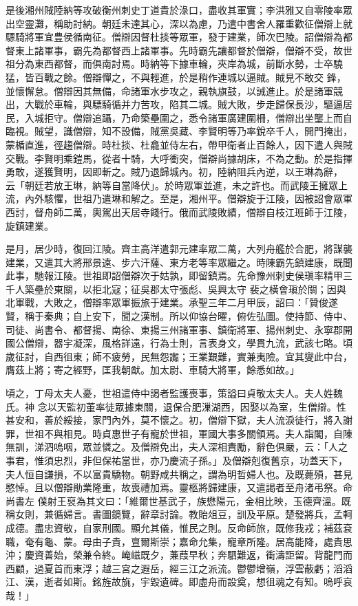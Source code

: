 \begin{pinyinscope}
 是後湘州賊陸納等攻破衡州刺史丁道貴於淥口，盡收其軍實；李洪雅又自零陵率眾出空靈灘，稱助討納。朝廷未達其心，深以為慮，乃遣中書舍人羅重歡征僧辯上就驃騎將軍宜豊侯循南征。僧辯因督杜掞等眾軍，發于建業，師次巴陵。詔僧辯為都督東上諸軍事，霸先為都督西上諸軍事。先時霸先讓都督於僧辯，僧辯不受，故世祖分為東西都督，而俱南討焉。時納等下據車輪，夾岸為城，前斷水勢，士卒驍猛，皆百戰之餘。僧辯憚之，不與輕進，於是稍作連城以逼賊。賊見不敢交
 鋒，並懷懈怠。僧辯因其無備，命諸軍水步攻之，親執旗鼓，以誡進止。於是諸軍競出，大戰於車輪，與驃騎循并力苦攻，陷其二城。賊大敗，步走歸保長沙，驅逼居民，入城拒守。僧辯追躡，乃命築壘圍之，悉令諸軍廣建圍柵，僧辯出坐壟上而自臨視。賊望，識僧辯，知不設備，賊黨吳藏、李賢明等乃率銳卒千人，開門掩出，蒙楯直進，徑趨僧辯。時杜掞、杜龕並侍左右，帶甲衛者止百餘人，因下遣人與賊交戰。李賢明乘鎧馬，從者十騎，大呼衝突，僧辯尚據胡床，不為之動。於是指揮勇敢，遂獲賢明，因即斬之。賊乃退歸城內。初，陸納阻兵內逆，以王琳為辭，
 云「朝廷若放王琳，納等自當降伏」。於時眾軍並進，未之許也。而武陵王擁眾上流，內外駭懼，世祖乃遣琳和解之。至是，湘州平。僧辯旋于江陵，因被詔會眾軍西討，督舟師二萬，輿駕出天居寺餞行。俄而武陵敗績，僧辯自枝江班師于江陵，旋鎮建業。



 是月，居少時，復回江陵。齊主高洋遣郭元建率眾二萬，大列舟艦於合肥，將謀襲建業，又遣其大將邢景遠、步六汗薩、東方老等率眾繼之。時陳霸先鎮建康，既聞此事，馳報江陵。世祖即詔僧辯次于姑孰，即留鎮焉。先命豫州刺史侯瑱率精甲三千人築壘於東關，以拒北寇；征吳郡太守張彪、吳興太守
 裴之橫會瑱於關；因與北軍戰，大敗之，僧辯率眾軍振旅于建業。承聖三年二月甲辰，詔曰：「贊俊遂賢，稱于秦典；自上安下，聞之漢制。所以仰協台曜，俯佐弘圖。使持節、侍中、司徒、尚書令、都督揚、南徐、東揚三州諸軍事、鎮衛將軍、揚州刺史、永寧郡開國公僧辯，器宇凝深，風格詳遠，行為士則，言表身文，學貫九流，武該七略。頃歲征討，自西徂東；師不疲勞，民無怨讟；王業艱難，實兼夷險。宜其燮此中台，膺茲上將；寄之經野，匡我朝猷。加太尉、車騎大將軍，餘悉如故。」



 頃之，丁母太夫人憂，世祖遣侍中謁者監護喪事，策謚曰貞敬太夫人。夫人姓魏氏。神
 念以天監初董率徒眾據東關，退保合肥漅湖西，因娶以為室，生僧辯。性甚安和，善於綏接，家門內外，莫不懷之。初，僧辯下獄，夫人流淚徒行，將入謝罪，世祖不與相見。時貞惠世子有寵於世祖，軍國大事多關領焉。夫人詣閣，自陳無訓，涕泗嗚咽，眾並憐之。及僧辯免出，夫人深相責勵，辭色俱嚴，云：「人之事君，惟須忠烈，非但保祐當世，亦乃慶流子孫。」及僧辯剋復舊京，功蓋天下，夫人恒自謙損，不以富貴驕物。朝野咸共稱之，謂為明哲婦人也。及既薨殞，甚見愍悼。且以僧辯勛業隆重，故喪禮加焉。靈柩將歸建康，又遣謁者至舟渚弔祭。命尚書左
 僕射王裒為其文曰：「維爾世基武子，族懋陽元，金相比映，玉德齊溫。既稱女則，兼循婦言。書圖鏡覽，辭章討論。教貽俎豆，訓及平原。楚發將兵，孟軻成德。盡忠資敬，自家刑國。顯允其儀，惟民之則。反命師旅，既修我戎；補茲袞職，奄有龜、蒙。母由子貴，亶爾斯崇；嘉命允集，寵章所隆。居高能降，處貴思沖；慶資善始，榮兼令終。崦嵫既夕，蒹葭早秋；奔駟難返，衝濤詎留。背龍門而西顧，過夏首而東浮；越三宮之遐岳，經三江之派流。鬱鬱增嶺，浮雲蔽虧；滔滔江、漢，逝者如斯。銘旌故旐，宇毀遺碑。即虛舟而設奠，想徂魂之有知。嗚呼哀哉！」




\end{pinyinscope}
